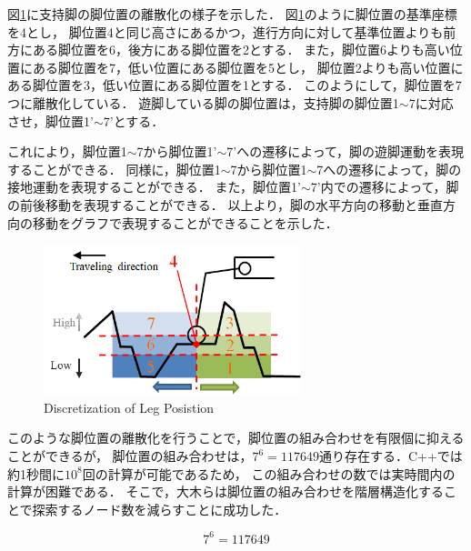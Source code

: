 図\ref*{fig:discretization}に支持脚の脚位置の離散化の様子を示した．
図\ref*{fig:discretization}のように脚位置の基準座標を4とし，
脚位置4と同じ高さにあるかつ，進行方向に対して基準位置よりも前方にある脚位置を6，後方にある脚位置を2とする．
また，脚位置6よりも高い位置にある脚位置を7，低い位置にある脚位置を5とし，
脚位置2よりも高い位置にある脚位置を3，低い位置にある脚位置を1とする．
このようにして，脚位置を7つに離散化している．
遊脚している脚の脚位置は，支持脚の脚位置1$\sim$7に対応させ，脚位置1'$\sim$7'とする．%

これにより，脚位置1$\sim$7から脚位置1'$\sim$7'への遷移によって，脚の遊脚運動を表現することができる．
同様に，脚位置1$\sim$7から脚位置1$\sim$7への遷移によって，脚の接地運動を表現することができる．
また，脚位置1'$\sim$7'内での遷移によって，脚の前後移動を表現することができる．
以上より，脚の水平方向の移動と垂直方向の移動をグラフで表現することができることを示した．

\begin{figure}[htbp]
  \begin{center}
    \includegraphics[width=75mm, clip]{figure/chapter2/discretization_of_leg_pos.png}
   \caption{Discretization of Leg Posistion}
   \label{fig:discretization}
  \end{center}
\end{figure}

このような脚位置の離散化を行うことで，脚位置の組み合わせを有限個に抑えることができるが，
脚位置の組み合わせは，$7^6 = 117649$通り存在する．C++では約1秒間に$10^8$回の計算が可能であるため，
この組み合わせの数では実時間内の計算が困難である．
そこで，大木らは脚位置の組み合わせを階層構造化することで探索するノード数を減らすことに成功した\cite{Oki_Graph_search}．

\begin{equation}
    7^6 = 117649
\end{equation}



